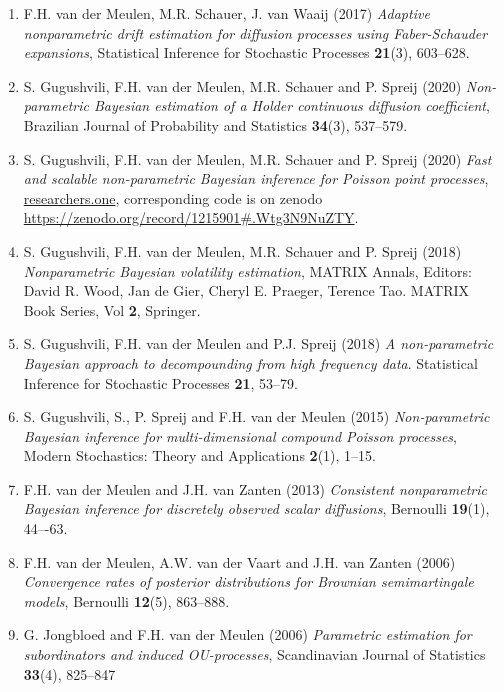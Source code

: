 \documentclass[
10pt, %
a4paper, %
oneside, %
headinclude,footinclude, %
BCOR5mm, %
]{scrartcl}
\begin{document}
\begin{enumerate}
\item {\sc F.H. van der Meulen, M.R. Schauer, J. van Waaij (2017)} {\it   Adaptive nonparametric drift estimation for diffusion processes using Faber-Schauder expansions},  Statistical Inference for Stochastic Processes {\bf 21}(3), 603--628.

\item {\sc S. Gugushvili, F.H. van der Meulen, M.R. Schauer and P. Spreij (2020)} {\it  Non-parametric Bayesian estimation of a Holder continuous diffusion coefficient}, Brazilian Journal of Probability and Statistics {\bf 34}(3), 537--579. 

\item {\sc S. Gugushvili, F.H. van der Meulen, M.R. Schauer and P. Spreij (2020)} {\it  Fast and scalable non-parametric Bayesian inference for Poisson point processes}, \url{researchers.one}, corresponding code is on zenodo \url{https://zenodo.org/record/1215901#.Wtg3N9NuZTY}.

\item {\sc S. Gugushvili, F.H. van der Meulen, M.R. Schauer and P. Spreij (2018)} {\it  Nonparametric Bayesian volatility estimation}, MATRIX Annals, Editors: David R. Wood, Jan de Gier, Cheryl E. Praeger, Terence Tao. MATRIX Book Series, Vol {\bf 2}, Springer.

\item {\sc S. Gugushvili, F.H. van der Meulen and P.J. Spreij (2018)} {\it  A non-parametric Bayesian approach to decompounding from high frequency data}. Statistical Inference for Stochastic Processes {\bf 21}, 53--79.

\item {\sc S. Gugushvili, S., P. Spreij and F.H. van der Meulen (2015)} {\it  Non-parametric Bayesian inference for multi-dimensional compound Poisson processes}, Modern Stochastics: Theory and Applications {\bf 2}(1), 1--15.

\item {\sc F.H. van der Meulen and J.H. van Zanten (2013)} {\it  Consistent nonparametric Bayesian inference for discretely observed scalar diffusions}, Bernoulli {\bf 19}(1), 44–-63.

\item {\sc F.H. van der Meulen, A.W. van der Vaart and J.H. van Zanten (2006)} {\it  Convergence rates of posterior distributions for Brownian semimartingale models}, Bernoulli {\bf 12}(5), 863--888.

\item {\sc G. Jongbloed and F.H. van der Meulen (2006)} {\it  Parametric estimation for subordinators and induced OU-processes}, Scandinavian Journal of Statistics {\bf 33}(4), 825--847


\end{enumerate}
\end{document}
